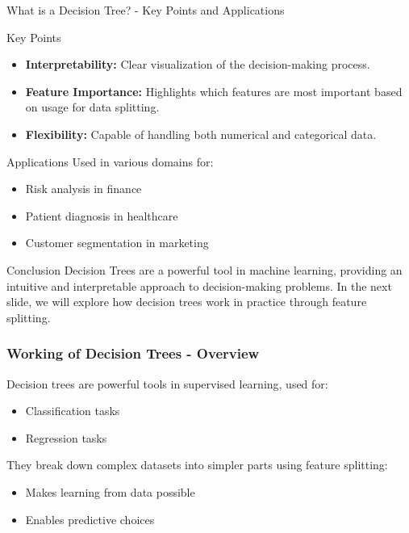 \documentclass[aspectratio=169]{beamer}
\begin{document}
\begin{frame}[fragile]{What is a Decision Tree? - Key Points and Applications}
    \begin{block}{Key Points}
        \begin{itemize}
            \item \textbf{Interpretability:} Clear visualization of the decision-making process.
            \item \textbf{Feature Importance:} Highlights which features are most important based on usage for data splitting.
            \item \textbf{Flexibility:} Capable of handling both numerical and categorical data.
        \end{itemize}
    \end{block}
    
    \begin{block}{Applications}
        Used in various domains for:
        \begin{itemize}
            \item Risk analysis in finance
            \item Patient diagnosis in healthcare
            \item Customer segmentation in marketing
        \end{itemize}
    \end{block}
    
    \begin{block}{Conclusion}
        Decision Trees are a powerful tool in machine learning, providing an intuitive and interpretable approach to decision-making problems. In the next slide, we will explore how decision trees work in practice through feature splitting.
    \end{block}
\end{frame}

\begin{frame}[fragile]
  \frametitle{Working of Decision Trees - Overview}
  Decision trees are powerful tools in supervised learning, used for:
  \begin{itemize}
    \item Classification tasks
    \item Regression tasks
  \end{itemize}
  They break down complex datasets into simpler parts using feature splitting:
  \begin{itemize}
    \item Makes learning from data possible
    \item Enables predictive choices
  \end{itemize}
\end{frame}
\end{document}

